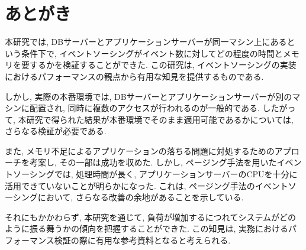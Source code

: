 \documentclass[../../main]{subfiles}
\begin{document}
    \section{あとがき}\label{sec:afterword}

    本研究では, DBサーバーとアプリケーションサーバーが同一マシン上にあるという条件下で, イベントソーシングがイベント数に対してどの程度の時間とメモリを要するかを検証することができた. この研究は, イベントソーシングの実装におけるパフォーマンスの観点から有用な知見を提供するものである.

    しかし, 実際の本番環境では, DBサーバーとアプリケーションサーバーが別のマシンに配置され, 同時に複数のアクセスが行われるのが一般的である. したがって, 本研究で得られた結果が本番環境でそのまま適用可能であるかについては, さらなる検証が必要である.

    また, メモリ不足によるアプリケーションの落ちる問題に対処するためのアプローチを考案し, その一部は成功を収めた. しかし, ページング手法を用いたイベントソーシングでは, 処理時間が長く, アプリケーションサーバーのCPUを十分に活用できていないことが明らかになった. これは, ページング手法のイベントソーシングにおいて, さらなる改善の余地があることを示している.

    それにもかかわらず, 本研究を通じて, 負荷が増加するにつれてシステムがどのように振る舞うかの傾向を把握することができた. この知見は, 実務におけるパフォーマンス検証の際に有用な参考資料となると考えられる.

    \clearpage
\end{document}
